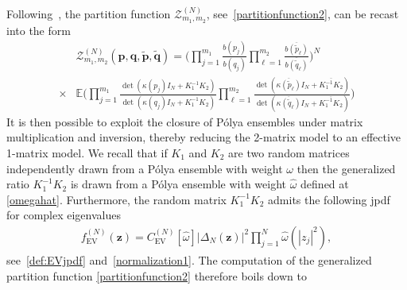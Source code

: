 \documentclass[pdflatex,sn-mathphys-num]{sn-jnl}
\theoremstyle{thmstyleone}
\numberwithin{equation}{section}
\begin{document}
 Following~\cite{hahnWindingNumberStatistics2023}, the partition function $\mathscr{Z}^{\left(N\right)}_{m_{1},m_{2}}$, see~\eqref{partitionfunction2}, can be recast into the form
\begin{align}\label{part}
    &\mathscr{Z}^{\left(N\right)}_{m_{1},m_{2}}\left(\textbf{p},\textbf{q},\widetilde{\textbf{p}},\widetilde{\textbf{q}}\right)=\Bigg( \prod\limits_{j=1}^{m_{1}}\frac{b\left ( p_{j} \right )}{b\left ( q_{j} \right )}\prod\limits_{\ell=1}^{m_{2}}\frac{\overline{b\left ( \widetilde{p}_{\ell} \right )}}{\overline{b\left ( \widetilde{q}_{\ell} \right )}} \Bigg)^{N} \nonumber
    \\
    \times&\mathbb{E}\Bigg(\prod_{j=1}^{m_{1}}\frac{\det\left ( \kappa\left ( p_{j} \right )I_{N}+K_{1}^{-1}K_{2} \right )}{\det\left ( \kappa\left ( q_{j} \right )I_{N}+K_{1}^{-1}K_{2} \right )}\prod_{\ell=1}^{m_{2}}\frac{\det\left ( \overline{\kappa\left ( \widetilde{p}_{\ell} \right )}I_{N}+\overline{K_{1}^{-1}K_{2}  } \right )}{\det\left ( \overline{\kappa\left ( \widetilde{q}_{\ell} \right )}I_{N}+\overline{K_{1}^{-1}K_{2}} \right )}\Bigg)
\end{align}
It is then possible to exploit the closure of P\'olya ensembles under matrix multiplication and inversion, thereby reducing the 2-matrix model to an effective 1-matrix model. 
We recall that if $K_{1}$ and $K_{2}$ are two random matrices independently drawn from a P\'olya ensemble with weight $\omega$ then the generalized ratio $K_{1}^{-1}K_{2}$ is drawn from a P\'olya ensemble with weight $\widehat{\omega}$ defined at \eqref{omegahat}. Furthermore, the random matrix $K_{1}^{-1}K_{2}$ admits the following jpdf for complex eigenvalues
    \begin{align}
        f^{(N)}_{\mathrm{EV}}\left(\mathbf{z}\right)=C^{\left ( N \right )}_{\mathrm{EV}}\left [ \widehat{\omega} \right ]\left | \Delta_{N}\left ( \mathbf{z} \right ) \right |^{2}\prod\limits_{j=1}^{N} \widehat{\omega}\left ( \left | z_{j} \right |^{2} \right ),
    \end{align}
see~\eqref{def:EVjpdf} and~\eqref{normalization1}.
The computation of the generalized partition function \eqref{partitionfunction2} therefore boils down to
\end{document}
